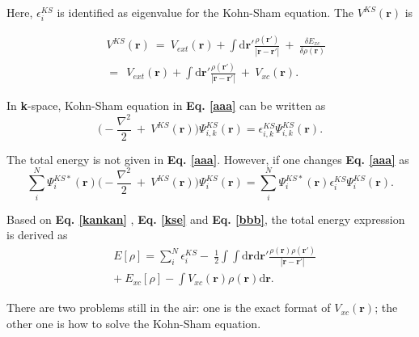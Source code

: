 \documentclass[a4paper, 12pt, titlepage,oneside,drop]{kthesis}
\begin{document}
Here, $\epsilon^{{KS}}_{{i}}$ is identified as eigenvalue for the Kohn-Sham equation. The $V^{KS}(\textbf{r})$ is 

\begin{equation}\begin{split}\label{xiahunao}
&\ V^{KS}(\textbf{r}) \ = \ V_{ext}(\textbf{r}) + \int \mathrm{d}{\textbf{r}'}  \frac{\rho(\textbf{r}')}{|{\textbf{r}}-{\textbf{r}}'|} \ + \ \frac{\delta{E_{xc}}}{\delta{\rho(\textbf{r})}} \\
&\ = \ \ V_{ext}(\textbf{r}) + \int \mathrm{d}{\textbf{r}'}  \frac{\rho(\textbf{r}')}{|{\textbf{r}}-{\textbf{r}}'|} \ + \ V_{xc}(\textbf{r}).
\end{split}
\end{equation}

In \textbf{k}-space, Kohn-Sham equation in \textbf{Eq. \ref{aaa}} can be written as
\begin{equation}\label{aaa111}
 \Big(-\frac{\nabla^{2}}{2}\ + \ V^{KS}(\textbf{r})\Big) \Psi^{{KS}}_{{i,k}}(\textbf{r}) = \epsilon^{{KS}}_{{i,k}} \Psi^{{KS}}_{{i,k}}(\textbf{r}).
\end{equation}


The total energy is not given in \textbf{Eq. \ref{aaa}}. However, if one changes \textbf{Eq. \ref{aaa}} as 
\begin{equation}\label{bbb}
\sum\limits_i^N \Psi^{{KS}*}_{{i}}(\textbf{r}) \Big(-\frac{\nabla^{2}}{2}\ + \ V^{KS}(\textbf{r})\Big) \Psi^{{KS}}_{{i}}(\textbf{r}) = \sum\limits_i^N \Psi^{{KS}*}_{{i}}(\textbf{r}) \epsilon^{{KS}}_{{i}}  \Psi^{{KS}}_{{i}}(\textbf{r}).
\end{equation}

Based on \textbf{Eq. \ref{kankan}} , \textbf{Eq. \ref{kse}} and \textbf{Eq. \ref{bbb}}, the total energy expression is derived as
\begin{equation}\label{totalenergy}
\begin{split}
& E[\rho] = \sum\limits_i^N \epsilon^{{KS}}_{{i}} - \ \frac{1}{2} \int \int \mathrm{d} {\textbf{r}} \mathrm{d}{\textbf{r}'} \frac{\rho({\textbf{r}})\rho(\textbf{r}')}{|{\textbf{r}}-{\textbf{r}}'|} \\
&    + \ E_{xc}[\rho] - \int   V_{xc}(\textbf{r}) \rho({\textbf{r}}) \mathrm{d} {\textbf{r}}.
\end{split}
\end{equation}

There are two problems still in the air: one is the exact format of $V_{xc}(\textbf{r})$; the other one is how to solve the Kohn-Sham equation.
\end{document}
